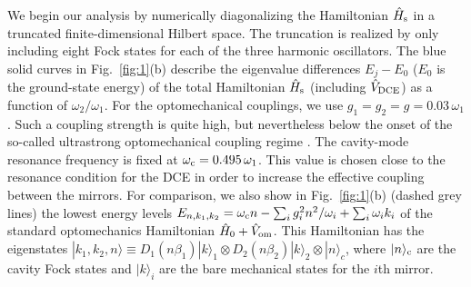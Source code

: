 \documentclass[aps,pra,twocolumn,floatfix,longbibliography, superscriptaddress]{revtex4-1}
\newcommand{\ket}[1]{|#1\rangle}
\begin{document}
We begin our analysis by numerically diagonalizing  the Hamiltonian $\hat H_{\rm s}$ in a truncated finite-dimensional Hilbert space. The truncation is realized by only including eight Fock states for each of the three harmonic oscillators.
The blue solid curves in Fig.~\ref{fig:1}(b) describe the eigenvalue differences $E_j-E_0$ ($E_0$ is the ground-state energy) of the total Hamiltonian $\hat H_{\rm s}$ (including $\hat V_{\rm DCE}$) as a function of $\omega_2 /\omega_1$. 
For the optomechanical couplings, we use  $g_1= g_2 = g = 0.03\, \omega_{1}$. Such a coupling strength is quite high, but nevertheless below the onset of the so-called ultrastrong optomechanical coupling regime \cite{Garziano2015b, Hu2015, Macri2016}. The cavity-mode resonance frequency is fixed at $\omega_{\rm c}  = 0.495\,\omega_1$. This value is chosen close to the resonance condition for the DCE \cite{Macri2017} in order to increase the effective coupling between the mirrors.
For comparison, we also show in Fig.~\ref{fig:1}(b) (dashed grey lines) the lowest energy levels $E_{n,k_1,k_2} = \omega_{\rm c} n - \sum_i g_i^2 n^2 / \omega_{ i} + \sum_i \omega_{i} k_i$
of the standard optomechanics Hamiltonian $\hat H_{0} + \hat V_{\rm om}$. This Hamiltonian has the eigenstates
$
\ket{k_1,k_2,n} \equiv D_1(n\beta_1) \ket{k}_1 \otimes D_2(n\beta_2)\ket{k}_2 \otimes  \ket{n}_c
$,
where $|n\rangle_{\rm c}$ are the cavity Fock states and $|k \rangle_i$ are the bare mechanical states for the $i$th  mirror. 
\end{document}
